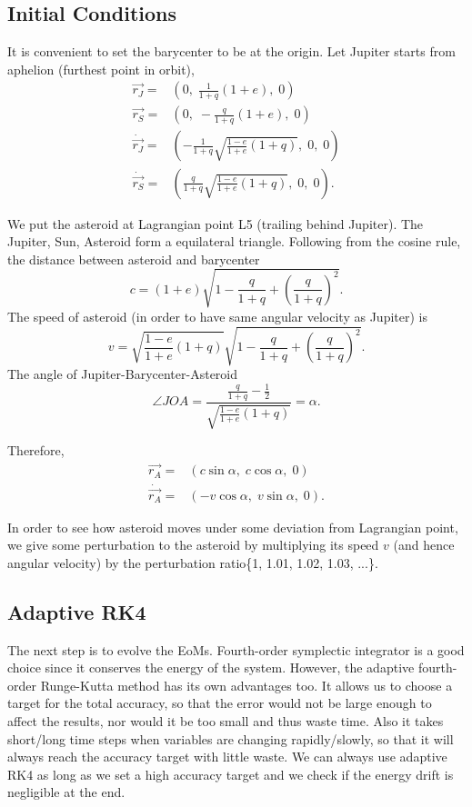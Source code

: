 \documentclass[12pt,a4paper]{article}
\begin{document}
\subsection{Initial Conditions}
It is convenient to set the barycenter to be at the origin. Let Jupiter starts from aphelion (furthest point in orbit),
\begin{align}
	\vec{r_J} =& (0, \; \frac{1}{1+q} (1+e), \; 0) \\
	\vec{r_S} =& (0, \; -\frac{q}{1+q} (1+e), \; 0) \\
	\dot{\vec{r_J}} =& (-\frac{1}{1+q} \sqrt{\frac{1-e}{1+e}(1+q)}, \; 0, \; 0) \\
	\dot{\vec{r_S}} =& (\frac{q}{1+q} \sqrt{\frac{1-e}{1+e}(1+q)}, \; 0, \; 0).
\end{align}

We put the asteroid at Lagrangian point L5 (trailing behind Jupiter). The Jupiter, Sun, Asteroid form a equilateral triangle. Following from the cosine rule, the distance between asteroid and barycenter
\[
c = (1+e)\sqrt{1-\frac{q}{1+q}+{\left(\frac{q}{1+q}\right)}^2}.
\]
The speed of asteroid (in order to have same angular velocity as Jupiter) is
\[
v =     \sqrt{\frac{1-e}{1+e}(1+q)}   \sqrt{1-\frac{q}{1+q}+{\left(\frac{q}{1+q}\right)}^2}.
\]
The angle of Jupiter-Barycenter-Asteroid
\[
\angle JOA  = \frac{ \frac{q}{1+q}-\frac{1}{2}}{\sqrt{\frac{1-e}{1+e}(1+q)}} = \alpha.
\]

Therefore,
\begin{align}
	\vec{r_A} =& (c \sin{\alpha},  \; c \cos{\alpha}, \; 0) \\
	\dot{\vec{r_A}} =& (-v \cos{\alpha},  \; v \sin{\alpha}, \; 0).
\end{align}

In order to see how asteroid moves under some deviation from Lagrangian point, we give some perturbation to the asteroid by multiplying its speed $v$ (and hence angular velocity) by the perturbation ratio\{1, 1.01, 1.02, 1.03, ...\}.

\subsection{Adaptive RK4}

The next step is to evolve the EoMs. Fourth-order symplectic integrator is a good choice since it conserves the energy of the system. However, the adaptive fourth-order Runge-Kutta method has its own advantages too. It allows us to choose a target for the total accuracy, so that the error would not be large enough to affect the results, nor would it be too small and thus waste time. Also it takes short/long time steps when variables are changing rapidly/slowly, so that it will always reach the accuracy target with little waste. We can always use adaptive RK4 as long as we set a high accuracy target and we check if the energy drift is negligible at the end.
\end{document}
